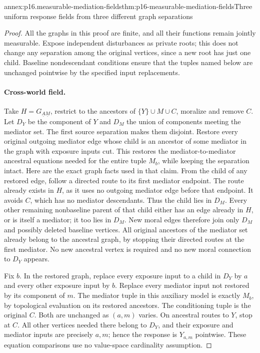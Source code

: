 \begin{annexitem}{annex:p16.measurable-mediation-fields}{thm:p16-measurable-mediation-fields}{Three uniform response fields from three different graph separations}
\begin{proof}
All the graphs in this proof are finite, and all their functions remain
jointly measurable. Expose independent disturbances as private roots;
this does not change any separation among the original vertices, since
a new root has just one child. Baseline nondescendant conditions ensure
that the tuples named below are unchanged pointwise by the specified
input replacements.

\paragraph{Cross-world field.}
Take \(H=G_{\underline A\underline M}\), restrict to the ancestors
of \(\{Y\}\cup M\cup C\), moralize and remove \(C\). Let \(D_Y\)
be the component of \(Y\) and \(D_M\) the union of components meeting
the mediator set. The first source separation makes them disjoint.
Restore every original outgoing mediator edge whose child is an ancestor
of some mediator in the graph with exposure inputs cut. This restores
the mediator-to-mediator ancestral equations needed for the entire tuple
\(M_b\), while keeping the separation intact. Here are the exact
graph facts used in that claim. From the child of any restored edge,
follow a directed route to its first mediator endpoint. The route already
exists in \(H\), as it uses no outgoing mediator edge before that
endpoint. It avoids \(C\), which has no mediator descendants. Thus
the child lies in \(D_M\). Every other remaining nonbaseline parent
of that child either has an edge already in \(H\), or is itself a
mediator; it too lies in \(D_M\). New moral edges therefore join only
\(D_M\) and possibly deleted baseline vertices. All original ancestors
of the mediator set already belong to the ancestral graph, by stopping
their directed routes at the first mediator. No new ancestral vertex
is required and no new moral connection to \(D_Y\) appears.

Fix \(b\). In the restored graph, replace every exposure input to a
child in \(D_Y\) by \(a\) and every other exposure input by \(b\).
Replace every mediator input not restored by its component of \(m\).
The mediator tuple in this auxiliary model is exactly \(M_b\), by
topological evaluation on its restored ancestors. The conditioning
tuple is the original \(C\). Both are unchanged as \((a,m)\) varies.
On ancestral routes to \(Y\), stop at \(C\). All other vertices
needed there belong to \(D_Y\), and their exposure and mediator inputs
are precisely \(a,m\); hence the response is \(Y_{a,m}\) pointwise.
These equation comparisons use no value-space cardinality assumption.


\end{proof}
\end{annexitem}
